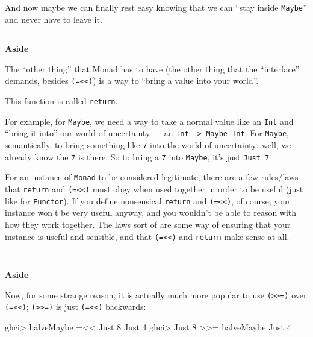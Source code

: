 \documentclass[]{article}
\newenvironment{Shaded}{}{}
\newcommand{\DataTypeTok}[1]{\textcolor[rgb]{0.56,0.13,0.00}{#1}}
\newcommand{\DecValTok}[1]{\textcolor[rgb]{0.25,0.63,0.44}{#1}}
\newcommand{\FunctionTok}[1]{\textcolor[rgb]{0.02,0.16,0.49}{#1}}
\newcommand{\NormalTok}[1]{#1}
\begin{document}
And now maybe we can finally rest easy knowing that we can ``stay inside
\texttt{Maybe}'' and never have to leave it.

\begin{center}\rule{0.5\linewidth}{\linethickness}\end{center}

\textbf{Aside}

The ``other thing'' that Monad has to have (the other thing that the
``interface'' demands, besides \texttt{(=\textless{}\textless{})}) is a way to
``bring a value into your world''.

This function is called \texttt{return}.

For example, for \texttt{Maybe}, we need a way to take a normal value like an
\texttt{Int} and ``bring it into'' our world of uncertainty --- an
\texttt{Int\ -\textgreater{}\ Maybe\ Int}. For \texttt{Maybe}, semantically, to
bring something like \texttt{7} into the world of uncertainty\ldots{}well, we
already know the \texttt{7} is there. So to bring a \texttt{7} into
\texttt{Maybe}, it's just \texttt{Just\ 7}

For an instance of \texttt{Monad} to be considered legitimate, there are a few
rules/laws that \texttt{return} and \texttt{(=\textless{}\textless{})} must obey
when used together in order to be useful (just like for \texttt{Functor}). If
you define nonsensical \texttt{return} and \texttt{(=\textless{}\textless{})},
of course, your instance won't be very useful anyway, and you wouldn't be able
to reason with how they work together. The laws sort of are some way of ensuring
that your instance is useful and sensible, and that
\texttt{(=\textless{}\textless{})} and \texttt{return} make sense at all.

\begin{center}\rule{0.5\linewidth}{\linethickness}\end{center}

\begin{center}\rule{0.5\linewidth}{\linethickness}\end{center}

\textbf{Aside}

Now, for some strange reason, it is actually much more popular to use
\texttt{(\textgreater{}\textgreater{}=)} over
\texttt{(=\textless{}\textless{})}; \texttt{(\textgreater{}\textgreater{}=)} is
just \texttt{(=\textless{}\textless{})} backwards:

\begin{Shaded}
\begin{Highlighting}[]
\NormalTok{ghci}\FunctionTok{>}\NormalTok{ halveMaybe }\FunctionTok{=<<} \DataTypeTok{Just} \DecValTok{8}
\DataTypeTok{Just} \DecValTok{4}
\NormalTok{ghci}\FunctionTok{>} \DataTypeTok{Just} \DecValTok{8} \FunctionTok{>>=}\NormalTok{ halveMaybe}
\DataTypeTok{Just} \DecValTok{4}
\end{Highlighting}
\end{Shaded}
\end{document}
